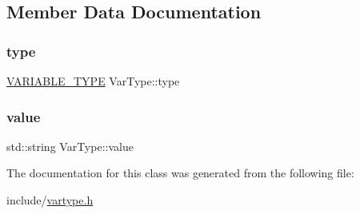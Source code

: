\subsection{Member Data Documentation}
\mbox{\label{classVarType_ada5e661872d79bc92631a1ac384d459e}} 
\subsubsection{\texorpdfstring{type}{type}}
{\footnotesize\ttfamily \hyperlink{statics_8h_a4c85b3a98d55cc0252806c950379cce0}{V\+A\+R\+I\+A\+B\+L\+E\+\_\+\+T\+Y\+PE} Var\+Type\+::type}

\mbox{\label{classVarType_adeb99cb6a17ce9cee53c165c912a333f}} 
\subsubsection{\texorpdfstring{value}{value}}
{\footnotesize\ttfamily std\+::string Var\+Type\+::value}



The documentation for this class was generated from the following file\+:\begin{DoxyCompactItemize}
\item 
include/\hyperlink{vartype_8h}{vartype.\+h}\end{DoxyCompactItemize}
